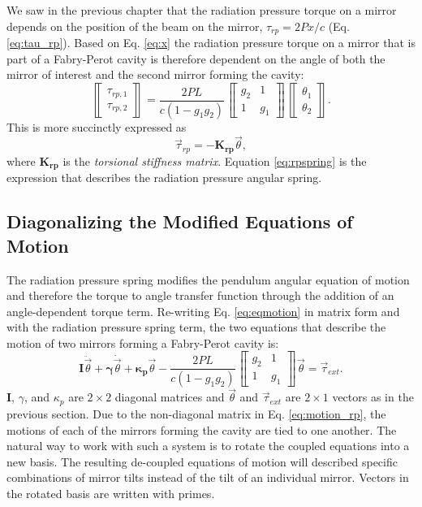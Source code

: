 We saw in the previous chapter that the radiation pressure torque on a
mirror depends on the position of the beam on the mirror, $\tau_{rp} =
2 P x / c$ (Eq. \ref{eq:tau_rp}). Based on Eq. \ref{eq:x} the
radiation pressure torque on a mirror that is part of a
Fabry-Perot cavity is therefore dependent on the angle of both the
mirror of interest and the second mirror forming the cavity:
\begin{equation}
\left\llbracket \begin{array}{c}
\tau_{rp,1}\\
\tau_{rp,2} \end{array} \right\rrbracket = \frac{2 P L}{c (1-g_1 g_2)}
\left\llbracket \begin{array}{cc}
g_2 & 1\\
1 & g_1\end{array} \right\rrbracket
\left\llbracket \begin{array}{c}
\theta_1\\
\theta_2 \end{array} \right\rrbracket.
\end{equation}
This is more succinctly expressed as
\begin{equation}
\vec{\tau}_{rp} = -\mathbf{K_{rp}} \vec{\theta},
\label{eq:rpspring}
\end{equation}
where $\mathbf{K_{rp}}$ is the \emph{torsional stiffness
  matrix}. Equation \ref{eq:rpspring} is the expression that describes
the radiation pressure angular spring.




\subsection{Diagonalizing the Modified Equations of Motion}
\label{sec:eigenbasis}
The radiation pressure spring modifies the pendulum angular equation
of motion and therefore the torque to angle transfer function
through the addition of an angle-dependent torque term. Re-writing
Eq. \ref{eq:eqmotion} in matrix form and with the radiation pressure
spring term, the two equations that describe the motion of two mirrors
forming a Fabry-Perot cavity is: 
\begin{equation}
\mathbf{I} \ddot{\vec{\theta}} 
+ {\bm \gamma} \dot{\vec{\theta}} 
+ \mathbf{\kappa_p} \vec{\theta}
- \frac{2 P L}{c (1-g_1 g_2)}
\left\llbracket \begin{array}{cc}
g_2 & 1\\
1 & g_1\end{array} \right\rrbracket \vec{\theta} 
= \vec{\tau}_{ext}.
\label{eq:motion_rp}
\end{equation}
$\mathbf{I}$, $\gamma$, and $\kappa_p$ are $2 \times 2$ diagonal
matrices and $\vec{\theta}$ and $\vec{\tau}_{ext}$ are $2 \times 1$
vectors as in the previous section. Due to the non-diagonal matrix in
Eq. \ref{eq:motion_rp}, the motions of each of the mirrors forming the
cavity are tied to one another. The natural way to work with such a
system is to rotate the coupled equations into a new basis. The
resulting de-coupled equations of motion will described specific
combinations of mirror tilts instead of the tilt of an individual mirror. Vectors in
the rotated basis are written with primes.

